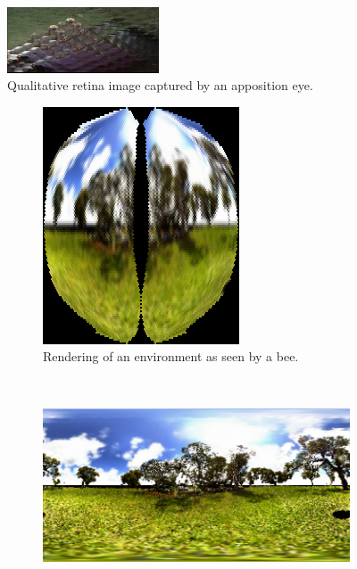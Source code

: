 \documentclass{acm_proc_article-sp}
\begin{document}
\begin{figure}
  \centering
  \includegraphics[width=0.4\textwidth]{bee-vision.jpg}
  \caption{Qualitative retina image captured by an apposition eye.}
  \label{appositeeye}
\end{figure}

\begin{centering}
\begin{figure}
  \begin{subfigure}[t]{0.1345\textwidth}
    \centering
    \includegraphics[width=\textwidth]{beeview.png}
    \caption{Rendering of an environment as seen by a bee.}
    \label{beeview}
  \end{subfigure}
  ~
  \begin{subfigure}[t]{0.3255\textwidth}
    \centering
    \includegraphics[width=\textwidth]{beeview-panorama.png}

\end{subfigure}
\end{figure}
\end{centering}
\end{document}
